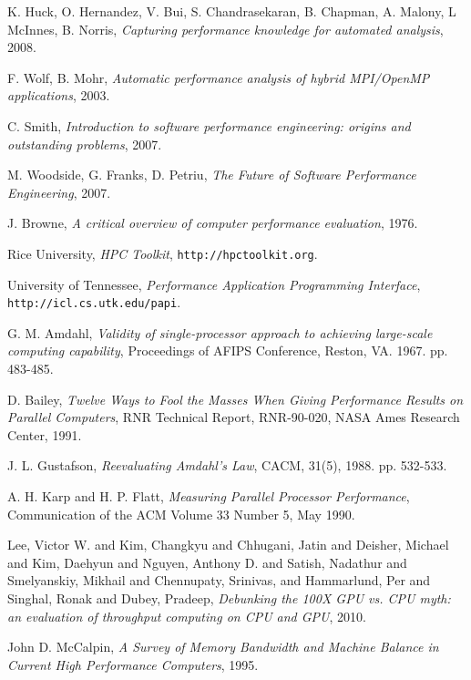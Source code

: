 \documentclass[a4paper]{report}
\begin{document}
\begin{thebibliography}{9}
  K. Huck, O. Hernandez, V. Bui, S. Chandrasekaran, B. Chapman, A. Malony,
  L McInnes, B. Norris,
  \emph{Capturing performance knowledge for automated analysis},
  2008.
  
  F. Wolf, B. Mohr,
  \emph{Automatic performance analysis of hybrid MPI/OpenMP applications},
  2003.
  
  C. Smith,
  \emph{Introduction to software performance engineering: origins and
    outstanding problems},
  2007.

  M. Woodside, G. Franks, D. Petriu,
  \emph{The Future of Software Performance Engineering},
  2007.

  J. Browne,
  \emph{A critical overview of computer performance evaluation},
  1976.

  Rice University,
  \emph{HPC Toolkit}, {\tt http://hpctoolkit.org}.
       
  University of Tennessee,
  \emph{Performance Application Programming Interface},
       {\tt http://icl.cs.utk.edu/papi}.
       
  G. M. Amdahl,
  \emph{Validity of single-processor approach to achieving large-scale
    computing capability},
  Proceedings of AFIPS Conference, Reston, VA. 1967. pp. 483-485.
  
  D. Bailey, \emph{Twelve Ways to Fool the Masses When Giving Performance
    Results on Parallel Computers},
  RNR Technical Report, RNR-90-020, NASA Ames Research Center, 1991.
  
  J. L. Gustafson,
  \emph{Reevaluating Amdahl's Law}, CACM, 31(5), 1988. pp. 532-533.
  
  A. H. Karp and H. P. Flatt,
  \emph{Measuring Parallel Processor Performance},
  Communication of the ACM Volume 33 Number 5, May 1990.
  
  {Lee, Victor W. and Kim, Changkyu and Chhugani, Jatin and Deisher, Michael
    and Kim, Daehyun and Nguyen, Anthony D. and Satish, Nadathur and
    Smelyanskiy, Mikhail and Chennupaty}, Srinivas, and Hammarlund, Per and
  Singhal, Ronak and Dubey, Pradeep,
  \emph{Debunking the 100X GPU vs. CPU myth: an evaluation of throughput
    computing on CPU and GPU},
  2010.
  
  John D. McCalpin,
  \emph{A Survey of Memory Bandwidth and Machine Balance in Current High
    Performance Computers},
  1995.
  

\end{thebibliography}
\end{document}
